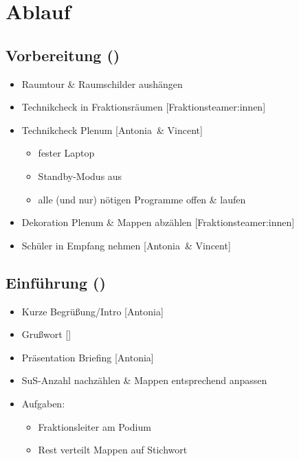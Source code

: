 \documentclass{article}
\newcommand{\KOM}{Antonia}
\newcommand{\EP}{Vincent}
\begin{document}
	\section{Ablauf}
	\subsection{Vorbereitung (\timeVorb)}
	\begin{itemize}
		\item Raumtour \& Raumschilder aushängen
        \item Technikcheck in Fraktionsräumen [Fraktionsteamer:innen]
		\item Technikcheck Plenum [\KOM\ \& \EP]
		\begin{itemize}
			\item fester Laptop
			\item Standby-Modus aus
			\item alle (und nur) nötigen Programme offen \& laufen
		\end{itemize}
		\item Dekoration Plenum \& Mappen abzählen [Fraktionsteamer:innen]
		\item Schüler in Empfang nehmen [\KOM\ \& \EP]
	\end{itemize}
	
	\subsection{Einführung (\timeEinf)}
	\begin{itemize}
		\item Kurze Begrüßung/Intro [\KOM]
		\item Grußwort [\EUVERTRETER]
		\item Präsentation Briefing [\KOM]
        \item SuS-Anzahl nachzählen \& Mappen entsprechend anpassen
        \item Aufgaben:
        \begin{itemize}
            \item Fraktionsleiter am Podium
            \item Rest verteilt Mappen auf Stichwort
        \end{itemize}
    \end{itemize}
	
\end{document}
